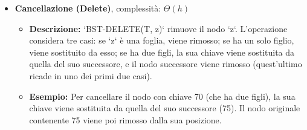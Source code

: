 \begin{itemize}
    \item \textbf{Cancellazione (Delete)}, complessità: $\Theta(h)$
    \begin{itemize}
        \item \textbf{Descrizione:} `BST-DELETE(T, z)` rimuove il nodo `z`. L'operazione considera tre casi: se `z` è una foglia, viene rimosso; se ha un solo figlio, viene sostituito da esso; se ha due figli, la sua chiave viene sostituita da quella del suo successore, e il nodo successore viene rimosso (quest'ultimo ricade in uno dei primi due casi).
        \item \textbf{Esempio:} Per cancellare il nodo con chiave 70 (che ha due figli), la sua chiave viene sostituita da quella del suo successore (75). Il nodo originale contenente 75 viene poi rimosso dalla sua posizione.
    \end{itemize}
\end{itemize}